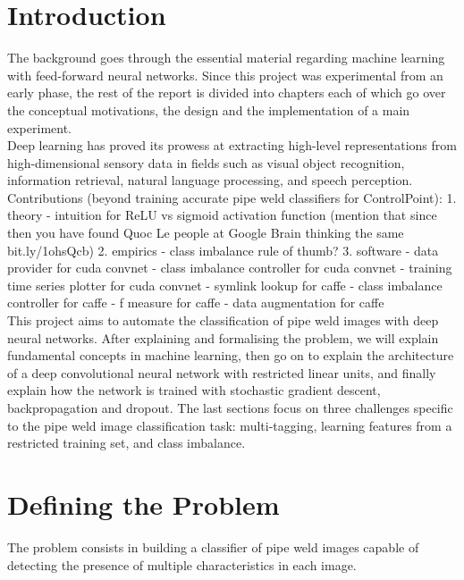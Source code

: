 \documentclass[a4paper,11pt]{article}
\begin{document}
\clearpage
\section{Introduction}

The background goes through the essential material regarding machine learning with feed-forward neural networks. Since this project was experimental from an early phase, the rest of the report is divided into chapters each of which go over the conceptual motivations, the design and the implementation of a main experiment. \\

Deep learning has proved its prowess at extracting high-level representations from high-dimensional sensory data in fields such as visual object recognition, information retrieval, natural language processing, and speech perception. \\

Contributions (beyond training accurate pipe weld classifiers for ControlPoint):
1. theory
-  intuition for ReLU vs sigmoid activation function (mention that since then you have found Quoc Le people at Google Brain thinking the same bit.ly/1ohsQcb)	
2. empirics
- class imbalance rule of thumb?
3. software
- data provider for cuda convnet
- class imbalance controller for cuda convnet
- training time series plotter for cuda convnet
- symlink lookup for caffe
- class imbalance controller for caffe
- f measure for caffe
- data augmentation for caffe \\



This project aims to automate the classification of pipe weld images with deep neural networks. After explaining and formalising the problem, we will explain fundamental concepts in machine learning, then go on to explain the architecture of a deep convolutional neural network with restricted linear units, and finally explain how the network is trained with stochastic gradient descent, backpropagation and dropout. The last sections focus on three challenges specific to the pipe weld image classification task: multi-tagging, learning features from a restricted training set, and class imbalance.

\section{Defining the Problem}

The problem consists in building a classifier of pipe weld images capable of detecting the presence of multiple characteristics in each image. 
\end{document}
